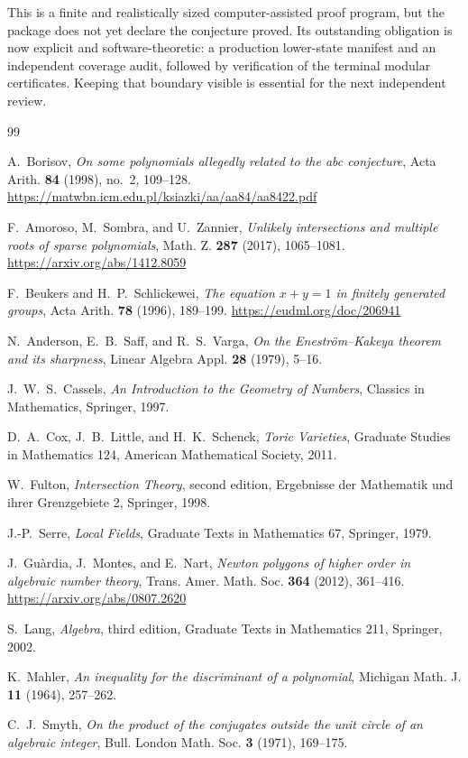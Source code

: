 \documentclass[11pt]{article}
\theoremstyle{definition}
\begin{document}
This is a finite and realistically sized computer-assisted proof program,
but the package does not yet declare the conjecture proved.  Its outstanding
obligation is now explicit and software-theoretic: a production lower-state
manifest and an independent coverage audit, followed by verification of the
terminal modular certificates.  Keeping that boundary visible is essential
for the next independent review.

\begin{thebibliography}{99}

A.~Borisov,
\emph{On some polynomials allegedly related to the abc conjecture},
Acta Arith. \textbf{84} (1998), no.~2, 109--128.
\url{https://matwbn.icm.edu.pl/ksiazki/aa/aa84/aa8422.pdf}


F.~Amoroso, M.~Sombra, and U.~Zannier,
\emph{Unlikely intersections and multiple roots of sparse polynomials},
Math. Z. \textbf{287} (2017), 1065--1081.
\url{https://arxiv.org/abs/1412.8059}

F.~Beukers and H.~P.~Schlickewei,
\emph{The equation \(x+y=1\) in finitely generated groups},
Acta Arith. \textbf{78} (1996), 189--199.
\url{https://eudml.org/doc/206941}

N.~Anderson, E.~B.~Saff, and R.~S.~Varga,
\emph{On the Enestr\"om--Kakeya theorem and its sharpness},
Linear Algebra Appl. \textbf{28} (1979), 5--16.

J.~W.~S.~Cassels,
\emph{An Introduction to the Geometry of Numbers},
Classics in Mathematics, Springer, 1997.

D.~A.~Cox, J.~B.~Little, and H.~K.~Schenck,
\emph{Toric Varieties},
Graduate Studies in Mathematics 124, American Mathematical Society, 2011.

W.~Fulton,
\emph{Intersection Theory}, second edition,
Ergebnisse der Mathematik und ihrer Grenzgebiete 2,
Springer, 1998.

J.-P.~Serre,
\emph{Local Fields},
Graduate Texts in Mathematics 67, Springer, 1979.

J.~Gu\`ardia, J.~Montes, and E.~Nart,
\emph{Newton polygons of higher order in algebraic number theory},
Trans. Amer. Math. Soc. \textbf{364} (2012), 361--416.
\url{https://arxiv.org/abs/0807.2620}

S.~Lang,
\emph{Algebra}, third edition,
Graduate Texts in Mathematics 211, Springer, 2002.

K.~Mahler,
\emph{An inequality for the discriminant of a polynomial},
Michigan Math. J. \textbf{11} (1964), 257--262.

C.~J.~Smyth,
\emph{On the product of the conjugates outside the unit circle of an
algebraic integer},
Bull. London Math. Soc. \textbf{3} (1971), 169--175.

\end{thebibliography}
\end{document}
